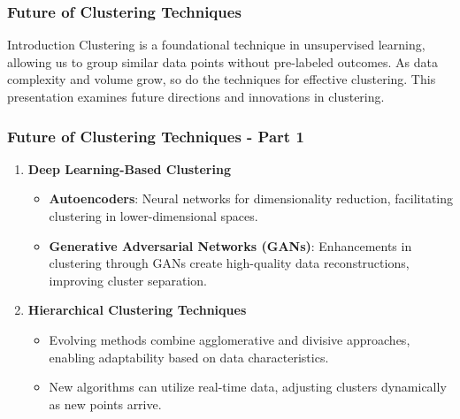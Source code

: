 \documentclass[aspectratio=169]{beamer}
\begin{document}
\begin{frame}[fragile]
    \frametitle{Future of Clustering Techniques}
    \begin{block}{Introduction}
        Clustering is a foundational technique in unsupervised learning, allowing us to group similar data points without pre-labeled outcomes. As data complexity and volume grow, so do the techniques for effective clustering. This presentation examines future directions and innovations in clustering.
    \end{block}
\end{frame}

\begin{frame}[fragile]
    \frametitle{Future of Clustering Techniques - Part 1}
    \begin{enumerate}
        \item \textbf{Deep Learning-Based Clustering}
            \begin{itemize}
                \item \textbf{Autoencoders}: Neural networks for dimensionality reduction, facilitating clustering in lower-dimensional spaces.
                \item \textbf{Generative Adversarial Networks (GANs)}: Enhancements in clustering through GANs create high-quality data reconstructions, improving cluster separation.
            \end{itemize}
        \item \textbf{Hierarchical Clustering Techniques}
            \begin{itemize}
                \item Evolving methods combine agglomerative and divisive approaches, enabling adaptability based on data characteristics.
                \item New algorithms can utilize real-time data, adjusting clusters dynamically as new points arrive.
            \end{itemize}
    \end{enumerate}
\end{frame}
\end{document}
